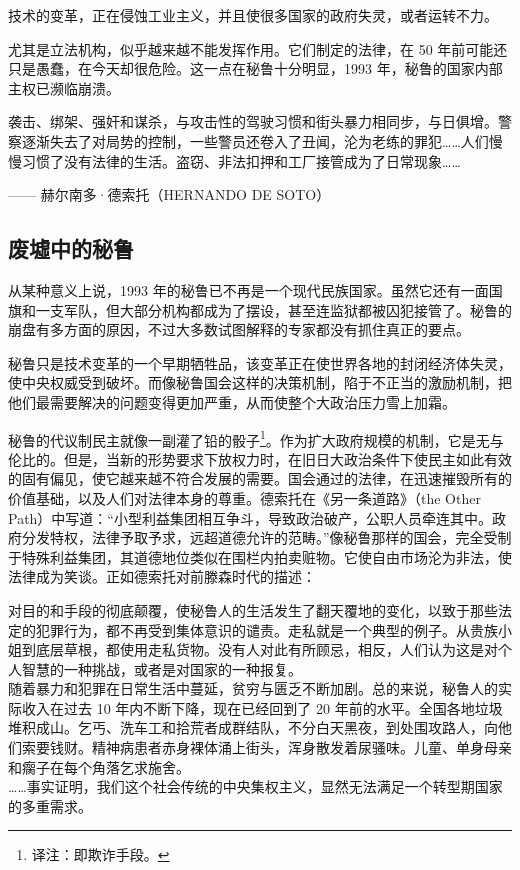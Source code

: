 技术的变革，正在侵蚀工业主义，并且使很多国家的政府失灵，或者运转不力。

尤其是立法机构，似乎越来越不能发挥作用。它们制定的法律，在 50 年前可能还只是愚蠢，在今天却很危险。这一点在秘鲁十分明显，1993 年，秘鲁的国家内部主权已濒临崩溃。

\begin{tcolorbox}
袭击、绑架、强奸和谋杀，与攻击性的驾驶习惯和街头暴力相同步，与日俱增。警察逐渐失去了对局势的控制，一些警员还卷入了丑闻，沦为老练的罪犯……人们慢慢习惯了没有法律的生活。盗窃、非法扣押和工厂接管成为了日常现象……
\end{tcolorbox}
\begin{flushright}
—— 赫尔南多·德索托（HERNANDO DE SOTO）
\end{flushright}

\subsection{废墟中的秘鲁}
从某种意义上说，1993 年的秘鲁已不再是一个现代民族国家。虽然它还有一面国旗和一支军队，但大部分机构都成为了摆设，甚至连监狱都被囚犯接管了。秘鲁的崩盘有多方面的原因，不过大多数试图解释的专家都没有抓住真正的要点。

秘鲁只是技术变革的一个早期牺牲品，该变革正在使世界各地的封闭经济体失灵，使中央权威受到破坏。而像秘鲁国会这样的决策机制，陷于不正当的激励机制，把他们最需要解决的问题变得更加严重，从而使整个大政治压力雪上加霜。

秘鲁的代议制民主就像一副灌了铅的骰子\footnote{译注：即欺诈手段。}。作为扩大政府规模的机制，它是无与伦比的。但是，当新的形势要求下放权力时，在旧日大政治条件下使民主如此有效的固有偏见，使它越来越不符合发展的需要。国会通过的法律，在迅速摧毁所有的价值基础，以及人们对法律本身的尊重。德索托在《另一条道路》（the Other Path）中写道：“小型利益集团相互争斗，导致政治破产，公职人员牵连其中。政府分发特权，法律予取予求，远超道德允许的范畴。”像秘鲁那样的国会，完全受制于特殊利益集团，其道德地位类似在围栏内拍卖赃物。它使自由市场沦为非法，使法律成为笑谈。正如德索托对前滕森时代的描述：


\begin{tcolorbox}
对目的和手段的彻底颠覆，使秘鲁人的生活发生了翻天覆地的变化，以致于那些法定的犯罪行为，都不再受到集体意识的谴责。走私就是一个典型的例子。从贵族小姐到底层草根，都使用走私货物。没有人对此有所顾忌，相反，人们认为这是对个人智慧的一种挑战，或者是对国家的一种报复。\\
随着暴力和犯罪在日常生活中蔓延，贫穷与匮乏不断加剧。总的来说，秘鲁人的实际收入在过去 10 年内不断下降，现在已经回到了 20 年前的水平。全国各地垃圾堆积成山。乞丐、洗车工和拾荒者成群结队，不分白天黑夜，到处围攻路人，向他们索要钱财。精神病患者赤身裸体涌上街头，浑身散发着尿骚味。儿童、单身母亲和瘸子在每个角落乞求施舍。\\
……事实证明，我们这个社会传统的中央集权主义，显然无法满足一个转型期国家的多重需求。
\end{tcolorbox}

